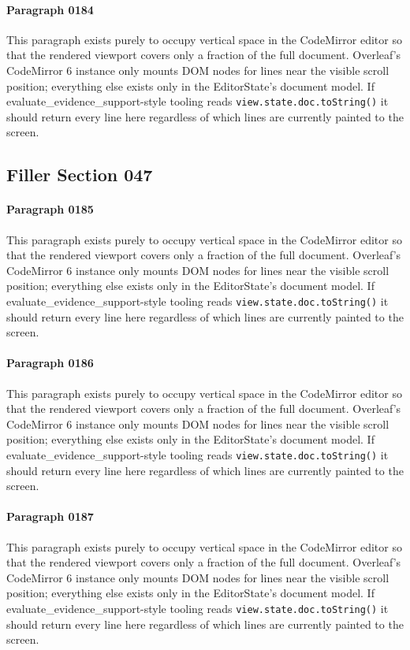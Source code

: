 \documentclass{article}
\begin{document}
\paragraph{Paragraph 0184}
This paragraph exists purely to occupy vertical space in the CodeMirror editor so that the rendered viewport covers only a fraction of the full document. Overleaf's CodeMirror 6 instance only mounts DOM nodes for lines near the visible scroll position; everything else exists only in the EditorState's document model. If evaluate\_evidence\_support-style tooling reads \texttt{view.state.doc.toString()} it should return every line here regardless of which lines are currently painted to the screen.

\subsection{Filler Section 047}
\paragraph{Paragraph 0185}
This paragraph exists purely to occupy vertical space in the CodeMirror editor so that the rendered viewport covers only a fraction of the full document. Overleaf's CodeMirror 6 instance only mounts DOM nodes for lines near the visible scroll position; everything else exists only in the EditorState's document model. If evaluate\_evidence\_support-style tooling reads \texttt{view.state.doc.toString()} it should return every line here regardless of which lines are currently painted to the screen.

\paragraph{Paragraph 0186}
This paragraph exists purely to occupy vertical space in the CodeMirror editor so that the rendered viewport covers only a fraction of the full document. Overleaf's CodeMirror 6 instance only mounts DOM nodes for lines near the visible scroll position; everything else exists only in the EditorState's document model. If evaluate\_evidence\_support-style tooling reads \texttt{view.state.doc.toString()} it should return every line here regardless of which lines are currently painted to the screen.

\paragraph{Paragraph 0187}
This paragraph exists purely to occupy vertical space in the CodeMirror editor so that the rendered viewport covers only a fraction of the full document. Overleaf's CodeMirror 6 instance only mounts DOM nodes for lines near the visible scroll position; everything else exists only in the EditorState's document model. If evaluate\_evidence\_support-style tooling reads \texttt{view.state.doc.toString()} it should return every line here regardless of which lines are currently painted to the screen.
\end{document}
